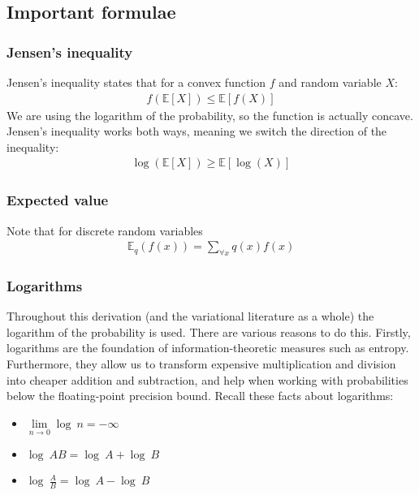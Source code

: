\subsection{Important formulae}


\subsubsection{Jensen's inequality}
Jensen’s inequality states that for a convex function $f $ and random
variable $X$: 
\begin{align}
f(\mathbb{E}[X]) \leq \mathbb{E}[f(X)] 
\end{align}
We are using the logarithm of the probability, so the function is actually concave. Jensen's inequality works both ways, meaning we switch the direction of the inequality:
    \begin{align}\log(\mathbb{E}[X]) \geq \mathbb{E}[\log(X)] \end{align}

\subsubsection{Expected value}
\label{expectedvalue}
Note that for discrete random variables 
\begin{align} \mathbb{E}_q(f(x)) = \sum\limits_{\forall x} q(x)f(x) \end{align}

\subsubsection{Logarithms}

Throughout this derivation (and the variational literature as a whole) the logarithm of the probability is used. There are various reasons to do this. Firstly, logarithms are the foundation of information-theoretic measures such as entropy. Furthermore, they allow us to transform expensive multiplication and division into cheaper addition and subtraction, and help when working with probabilities below the floating-point precision bound. Recall these facts about logarithms:

\begin{itemize}

\item $\lim\limits_{n\rightarrow 0} \log\ n = -\infty $
\item $\log\ AB = \log\ A + \log\ B $
\item $\log\ \frac{A}{B} = \log\ A - \log\ B $
\end{itemize}


